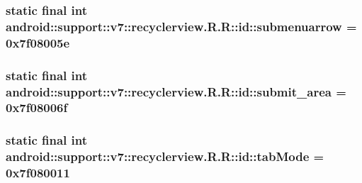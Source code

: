 \hypertarget{classandroid_1_1support_1_1v7_1_1recyclerview_1_1_r_1_1id_3180dd66cc765f13fde9ed23ca23fdfb}{
\subsubsection[{submenuarrow}]{\setlength{\rightskip}{0pt plus 5cm}static final int android::support::v7::recyclerview.R.R::id::submenuarrow = 0x7f08005e}}
\label{classandroid_1_1support_1_1v7_1_1recyclerview_1_1_r_1_1id_3180dd66cc765f13fde9ed23ca23fdfb}


\hypertarget{classandroid_1_1support_1_1v7_1_1recyclerview_1_1_r_1_1id_2610259a07f32e859ee2c3fd4c87679f}{
\subsubsection[{submit\_\-area}]{\setlength{\rightskip}{0pt plus 5cm}static final int android::support::v7::recyclerview.R.R::id::submit\_\-area = 0x7f08006f}}
\label{classandroid_1_1support_1_1v7_1_1recyclerview_1_1_r_1_1id_2610259a07f32e859ee2c3fd4c87679f}


\hypertarget{classandroid_1_1support_1_1v7_1_1recyclerview_1_1_r_1_1id_962d48dccada5bd1b179925d39827b30}{
\subsubsection[{tabMode}]{\setlength{\rightskip}{0pt plus 5cm}static final int android::support::v7::recyclerview.R.R::id::tabMode = 0x7f080011}}
\label{classandroid_1_1support_1_1v7_1_1recyclerview_1_1_r_1_1id_962d48dccada5bd1b179925d39827b30}


